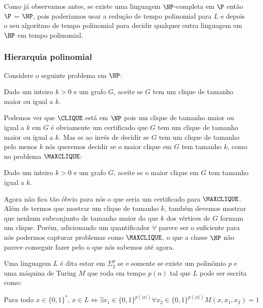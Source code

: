 Como já observamos antes, se existe uma linguagem $\NP$-completa em $\P$ então $\P$ = $\NP$, pois poderiamos usar a redução de tempo polinomial para $L$ e depois o seu algoritmo de tempo polinomial para decidir qualquer outra linguagem em $\NP$ em tempo polinomial.






\subsubsection{Hierarquia polinomial}

Considere o seguinte problema em $\NP$:

\begin{clique}

Dado um inteiro $k > 0$ e um grafo $G$, aceite se $G$ tem um clique de tamanho maior ou igual a $k$.

\end{clique}

Podemos ver que $\CLIQUE$ está em $\NP$ pois um clique de tamanho maior ou igual a $k$ em $G$ é obviamente um certificado que $G$ tem um clique de tamanho maior ou igual a $k$. Mas se ao invés de decidir se $G$ tem um clique de tamanho pelo menos $k$ nós queremos decidir se o maior clique em $G$ tem tamanho $k$, como no problema $\MAXCLIQUE$:

\begin{maxclique}

Dado um inteiro $k > 0$ e um grafo $G$, aceite se o maior clique em $G$ tem tamanho igual a $k$.

\end{maxclique}

Agora não fica tão óbvio para nós o que seria um certificado para $\MAXCLIQUE$. Além de termos que mostrar um clique de tamanho $k$, também devemos mostrar que nenhum subconjunto de tamanho maior do que $k$ dos vértices de $G$ formam um clique. Porém, adicionando um quantificador $\forall$ parece ser o suficiente para nós podermos capturar problemas como $\MAXCLIQUE$, o que a classe $\NP$ não parece conseguir fazer pelo o que nós sabemos até agora.

\begin{defi} 

Uma linguagem $L$ é dita estar em $\Sigma_{2}^{p}$ se e somente se existe um polinômio $p$ e uma máquina de Turing $M$ que roda em tempo $p(n)$ tal que $L$ pode ser escrita como:

\begin{equation*}
    \text{Para todo } x \in \{0, 1\}^{*} \text{, } x \in L \iff \exists x_{1} \in \{0, 1\}^{p(\lvert x \rvert)} \forall x_{2} \in \{0, 1\}^{p(\lvert x \rvert)} M(x, x_{1}, x_{2}) = 1
\end{equation*}

\end{defi}

